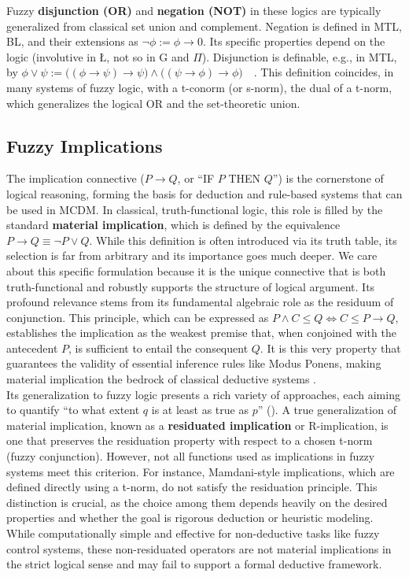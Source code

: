 Fuzzy \textbf{disjunction (OR)} and \textbf{negation (NOT)} in these logics are typically generalized from classical set union and complement. Negation is defined in MTL, BL, and their extensions as $\lnot \phi := \phi \rightarrow 0$. Its specific properties depend on the logic (involutive in \L, not so in G and $\Pi$). Disjunction is definable, e.g., in MTL, by $\phi \vee \psi := \big((\phi \rightarrow \psi) \rightarrow \psi\big) \wedge \big((\psi \rightarrow \phi) \rightarrow \phi\big)$~\cite[Def. 1]{GodoMonoidal}~\cite[Def. 2.2.1]{Hajek1998}. This definition coincides, in many systems of fuzzy logic, with a t-conorm (or s-norm), the dual of a t-norm, which generalizes the logical OR and the set-theoretic union.

\subsection{Fuzzy Implications}

The implication connective ($P \rightarrow Q$, or ``IF $P$ THEN $Q$'') is the cornerstone of logical reasoning, forming the basis for deduction and rule-based systems that can be used in MCDM. In classical, truth-functional logic, this role is filled by the standard \textbf{material implication}, which is defined by the equivalence $P \rightarrow Q \equiv \neg P \lor Q$. While this definition is often introduced via its truth table, its selection is far from arbitrary and its importance goes much deeper. We care about this specific formulation because it is the unique connective that is both truth-functional and robustly supports the structure of logical argument. Its profound relevance stems from its fundamental algebraic role as the residuum of conjunction. This principle, which can be expressed as $P \land C \le Q \iff C \le P \rightarrow Q$, establishes the implication as the weakest premise that, when conjoined with the antecedent $P$, is sufficient to entail the consequent $Q$. It is this very property that guarantees the validity of essential inference rules like Modus Ponens, making material implication the bedrock of classical deductive systems \cite{KORNELL_2023}.\\

Its generalization to fuzzy logic presents a rich variety of approaches, each aiming to quantify ``to what extent $q$ is at least as true as $p$'' (\cite[p.57]{FULLER2}). A true generalization of material implication, known as a \textbf{residuated implication} or R-implication, is one that preserves the residuation property with respect to a chosen t-norm (fuzzy conjunction). However, not all functions used as implications in fuzzy systems meet this criterion. For instance, Mamdani-style implications, which are defined directly using a t-norm, do not satisfy the residuation principle. This distinction is crucial, as the choice among them depends heavily on the desired properties and whether the goal is rigorous deduction or heuristic modeling. While computationally simple and effective for non-deductive tasks like fuzzy control systems, these non-residuated operators are not material implications in the strict logical sense and may fail to support a formal deductive framework.


